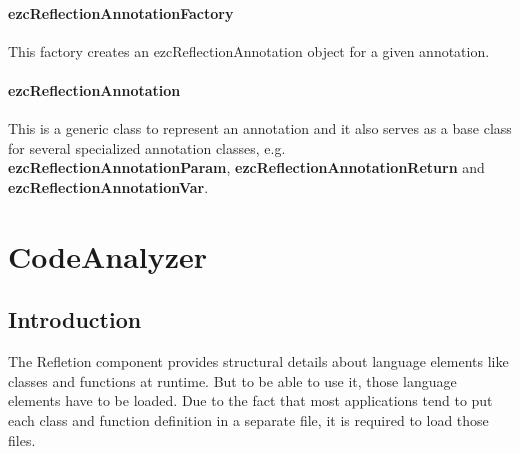 \documentclass[10pt,final,a4paper,oneside]{article}
\begin{document}
\paragraph{ezcReflectionAnnotationFactory}
This factory creates an ezcReflectionAnnotation
object for a given annotation.

\paragraph{ezcReflectionAnnotation}
This is a generic class to represent an annotation
and it also serves as a base class for several
specialized annotation classes, e.g.
\textbf{ezcReflectionAnnotationParam},
\textbf{ezcReflectionAnnotationReturn} and
\textbf{ezcReflectionAnnotationVar}.










\section{CodeAnalyzer}\label{sec:CodeAnalyzer}
%
\subsection{Introduction}
The Refletion component provides structural details about
language elements like classes and functions at runtime.
But to be able to use it, those language elements have to be loaded.
Due to the fact that most applications tend to put each class
and function definition in a separate file, it is required to load those files.
\end{document}
